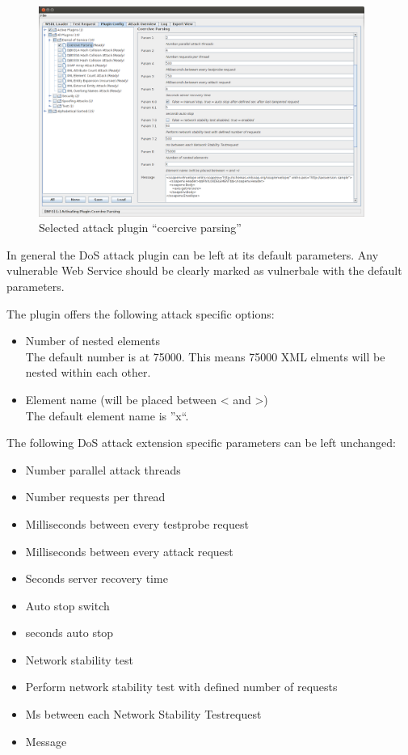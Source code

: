 \begin{figure}[H]
    \begin{center}
        \includegraphics[width=0.95\textwidth]{img/dosStep3_1.png}
    \end{center}
    \caption{Selected attack plugin ``coercive parsing''}
    \label{fig:dosStep3}
\end{figure}

In general the DoS attack plugin can be left at its default parameters. 
Any vulnerable Web Service should be clearly marked as vulnerbale with the default parameters. 

The plugin offers the following attack specific options:
\begin{itemize}
    \item Number of nested elements \\The default number is at 75000. This means 75000 XML elments will be nested within each other.
    \item Element name (will be placed between < and >) \\The default element name is ''x``.
\end{itemize}

The following DoS attack extension specific parameters can be left unchanged:
\begin{itemize}
    \item Number parallel attack threads
    \item Number requests per thread 
    \item Milliseconds between every testprobe request
    \item Milliseconds between every attack request
    \item Seconds server recovery time
    \item Auto stop switch
    \item seconds auto stop
    \item Network stability test 
    \item Perform network stability test with defined number of requests
    \item Ms between each Network Stability Testrequest
    \item Message
\end{itemize}

